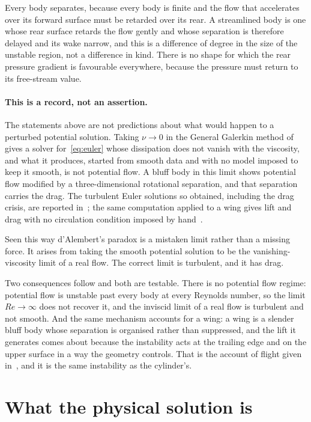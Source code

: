 \documentclass[11pt]{article}
\begin{document}
Every body separates, because every body is finite and the flow that accelerates over its forward
surface must be retarded over its rear. A streamlined body is one whose rear surface retards the
flow gently and whose separation is therefore delayed and its wake narrow, and this is a difference
of degree in the size of the unstable region, not a difference in kind. There is no shape for which
the rear pressure gradient is favourable everywhere, because the pressure must return to its
free-stream value.

\paragraph{This is a record, not an assertion.} The statements above are not predictions about
what would happen to a perturbed potential solution. Taking $\nu\to0$ in the General Galerkin method
of~\cite{book} gives a solver for~\eqref{eq:euler} whose dissipation does not vanish with the
viscosity, and what it produces, started from smooth data and with no model imposed to keep it
smooth, is not potential flow. A bluff body in this limit shows potential flow modified by a
three-dimensional rotational separation, and that separation carries the drag. The turbulent Euler
solutions so obtained, including the drag crisis, are reported in~\cite{dragcrisis}; the same
computation applied to a wing gives lift and drag with no circulation condition imposed by
hand~\cite{flight}.

Seen this way d'Alembert's paradox is a mistaken limit rather than a missing force. It arises from
taking the smooth potential solution to be the vanishing-viscosity limit of a real flow. The correct
limit is turbulent, and it has drag.

Two consequences follow and both are testable. There is no potential flow regime: potential flow is
unstable past every body at every Reynolds number, so the limit $Re\to\infty$ does not recover it,
and the inviscid limit of a real flow is turbulent and not smooth. And the same mechanism accounts
for a wing: a wing is a slender bluff body whose separation is organised rather than suppressed, and
the lift it generates comes about because the instability acts at the trailing edge and on the upper
surface in a way the geometry controls. That is the account of flight given in~\cite{flight}, and it
is the same instability as the cylinder's.

\section{What the physical solution is}\label{sec:weak}
\end{document}
